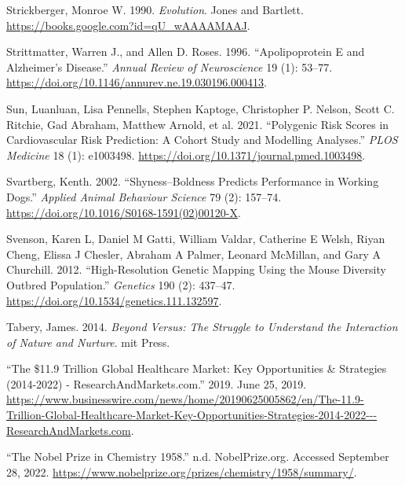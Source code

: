 \documentclass[
]{book}
\newlength{\cslhangindent}
\newlength{\cslentryspacingunit} %
\newenvironment{CSLReferences}[2] %
 {%
  \setlength{\parindent}{0pt}
  \ifodd #1
  \let\oldpar\par
  \def\par{\hangindent=\cslhangindent\oldpar}
  \fi
  \setlength{\parskip}{#2\cslentryspacingunit}
 }%
 {}
\begin{document}
\begin{CSLReferences}{1}{0}
\leavevmode{}%
Strickberger, Monroe W. 1990. \emph{Evolution}. {Jones and Bartlett}. \url{https://books.google.com?id=qU_wAAAAMAAJ}.

\leavevmode{}%
Strittmatter, Warren J., and Allen D. Roses. 1996. {``Apolipoprotein {E} and {Alzheimer}'s {Disease}.''} \emph{Annual Review of Neuroscience} 19 (1): 53--77. \url{https://doi.org/10.1146/annurev.ne.19.030196.000413}.

\leavevmode{}%
Sun, Luanluan, Lisa Pennells, Stephen Kaptoge, Christopher P. Nelson, Scott C. Ritchie, Gad Abraham, Matthew Arnold, et al. 2021. {``Polygenic Risk Scores in Cardiovascular Risk Prediction: {A} Cohort Study and Modelling Analyses.''} \emph{PLOS Medicine} 18 (1): e1003498. \url{https://doi.org/10.1371/journal.pmed.1003498}.

\leavevmode{}%
Svartberg, Kenth. 2002. {``Shyness--Boldness Predicts Performance in Working Dogs.''} \emph{Applied Animal Behaviour Science} 79 (2): 157--74. \url{https://doi.org/10.1016/S0168-1591(02)00120-X}.

\leavevmode{}%
Svenson, Karen L, Daniel M Gatti, William Valdar, Catherine E Welsh, Riyan Cheng, Elissa J Chesler, Abraham A Palmer, Leonard McMillan, and Gary A Churchill. 2012. {``High-{Resolution Genetic Mapping Using} the {Mouse Diversity Outbred Population}.''} \emph{Genetics} 190 (2): 437--47. \url{https://doi.org/10.1534/genetics.111.132597}.

\leavevmode{}%
Tabery, James. 2014. \emph{Beyond Versus: {The} Struggle to Understand the Interaction of Nature and Nurture}. {mit Press}.

\leavevmode{}%
{``The \$11.9 {Trillion Global Healthcare Market}: {Key Opportunities} \& {Strategies} (2014-2022) - {ResearchAndMarkets}.com.''} 2019. June 25, 2019. \url{https://www.businesswire.com/news/home/20190625005862/en/The-11.9-Trillion-Global-Healthcare-Market-Key-Opportunities-Strategies-2014-2022---ResearchAndMarkets.com}.

\leavevmode{}%
{``The {Nobel Prize} in {Chemistry} 1958.''} n.d. {NobelPrize.org}. Accessed September 28, 2022. \url{https://www.nobelprize.org/prizes/chemistry/1958/summary/}.


\end{CSLReferences}
\end{document}
